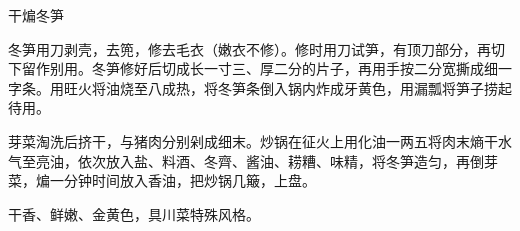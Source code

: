 \begin{recipe}{干煸冬笋}

\ingredients


\cooking

\step 冬笋用刀剥壳，去篼，修去毛衣（嫩衣不修）。修时用刀试笋，有顶刀部分，再切下留作别用。冬笋修好后切成长一寸三、厚二分的片子，再用手按二分宽撕成细一字条。用旺火将油烧至八成热，将冬笋条倒入锅内炸成牙黄色，用漏瓢将笋子捞起待用。

\step 芽菜淘洗后挤干，与猪肉分别剁成细末。炒锅在征火上用化油一两五将肉末熵干水气至亮油，依次放入盐、料酒、冬齊、酱油、耢糟、味精，将冬笋造匀，再倒芽菜，煸一分钟时间放入香油，把炒锅几簸，上盘。

\notes

干香、鲜嫩、金黄色，具川菜特殊风格。

\end{recipe}

